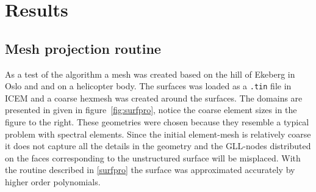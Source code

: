 
\chapter{Results} %

\label{results} %




\section{Mesh projection routine}
As a test of the algorithm a mesh was created based on the hill of Ekeberg in Oslo and
and on a helicopter body.
The surfaces was loaded as a \verb|.tin| file in ICEM and a coarse hexmesh was created 
around the surfaces. The domains are presented in given in 
figure~\ref{fig:surfpro}, notice the coarse element sizes in the figure to the right.
These geometries were chosen because they resemble a typical problem with 
spectral elements. Since the initial element-mesh is relatively coarse it does not capture all 
the details in the geometry and the GLL-nodes distributed on the faces corresponding to the 
unstructured surface will be misplaced. 
With the routine described in \cref{surfpro} the surface was approximated accurately by higher order polynomials.
%

